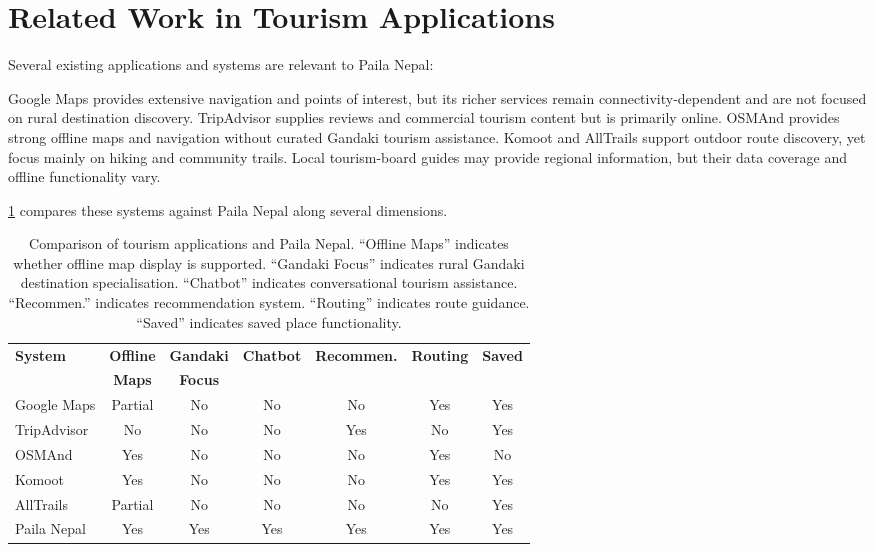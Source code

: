 \documentclass[12pt,a4paper,oneside]{report}
\begin{document}
\section{Related Work in Tourism Applications}
\label{sec:related_work}

Several existing applications and systems are relevant to Paila Nepal:

Google Maps provides extensive navigation and points of interest, but its richer services remain connectivity-dependent and are not focused on rural destination discovery. TripAdvisor supplies reviews and commercial tourism content but is primarily online. OSMAnd provides strong offline maps and navigation without curated Gandaki tourism assistance. Komoot and AllTrails support outdoor route discovery, yet focus mainly on hiking and community trails. Local tourism-board guides may provide regional information, but their data coverage and offline functionality vary.

\cref{tbl:related_work} compares these systems against Paila Nepal along several dimensions.

\begin{table}[h]
\centering
\small
\begin{tabular}{lcccccc}
\toprule
\textbf{System} & \textbf{Offline} & \textbf{Gandaki} & \textbf{Chatbot} & \textbf{Recommen.} & \textbf{Routing} & \textbf{Saved} \\
& \textbf{Maps} & \textbf{Focus} & & & & \\
\midrule
Google Maps & Partial & No & No & No & Yes & Yes \\
TripAdvisor & No & No & No & Yes & No & Yes \\
OSMAnd & Yes & No & No & No & Yes & No \\
Komoot & Yes & No & No & No & Yes & Yes \\
AllTrails & Partial & No & No & No & No & Yes \\
Paila Nepal & Yes & Yes & Yes & Yes & Yes & Yes \\
\bottomrule
\end{tabular}
\caption{Comparison of tourism applications and Paila Nepal. ``Offline Maps'' indicates whether offline map display is supported. ``Gandaki Focus'' indicates rural Gandaki destination specialisation. ``Chatbot'' indicates conversational tourism assistance. ``Recommen.'' indicates recommendation system. ``Routing'' indicates route guidance. ``Saved'' indicates saved place functionality.}
\label{tbl:related_work}
\end{table}
\end{document}
